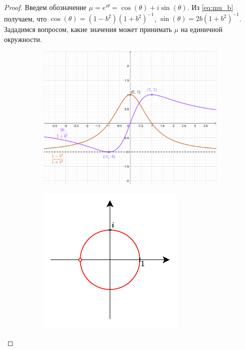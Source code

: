 \documentclass{article}
\newtheorem*{proof}{$\square$}
\begin{document}
\begin{proof}
		Введем обозначение $\mu = e^{i\theta} = \cos(\theta) + i \sin(\theta)$. Из \eqref{eq:mu_b} получаем, что $\cos(\theta) = (1-b^2)(1+b^2)^{-1}$, $\sin(\theta) = 2b (1+b^2)^{-1}$. Зададимся вопросом, какие значения может принимать $\mu$ на единичной окружности.
		
		\begin{figure}[h!]
			\centering
			\begin{subfigure}[h]{0.45\linewidth}
				\centering
				\includegraphics[width=\linewidth]{figures/mu_sin_cos}
			\end{subfigure}
			\hfill
			\begin{subfigure}[h]{0.35\linewidth}
				\centering
				\includegraphics[width=\linewidth]{figures/muQ}
			\end{subfigure}
		\end{figure}
		

\end{proof}
\end{document}

